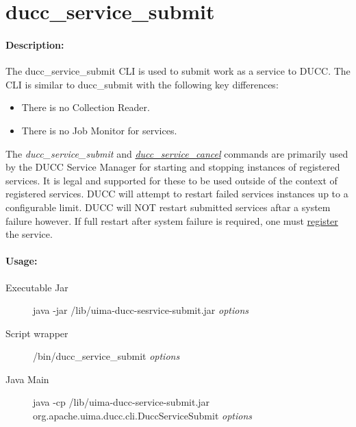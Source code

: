 \ifpdf
\else
{}
\fi
    \section{ducc\_service\_submit}
    \label{sec:cli.service-submit}
    \paragraph{Description:}
    The ducc\_service\_submit CLI is used to submit work as a service to DUCC. The CLI is similar to
    ducc\_submit with the following key differences:
    
    \begin{itemize}
        \item There is no Collection Reader. 
        \item There is no Job Monitor  for services.
    \end{itemize}
        
    The {\em ducc\_service\_submit} and \hyperref[sec:cli.service-cancel]{{\em
        ducc\_service\_cancel}} commands are primarily used by the DUCC Service Manager for starting
    and stopping instances of registered services.  It is legal and supported for these to be used
    outside of the context of registered services.  DUCC will attempt to restart failed services
    instances up to a configurable limit.  DUCC will NOT restart submitted services aftar a
    system failure however.  If full restart after system failure is required, one must
    \hyperref[subsec:cli.ducc-services.register]{register} the service.
 

    \paragraph{Usage:}
    \begin{description}
    \item[Executable Jar] java -jar \ducchome/lib/uima-ducc-sesrvice-submit.jar {\em options}
    \item[Script wrapper] \ducchome/bin/ducc\_service\_submit {\em options}
    \item[Java Main]      java -cp \ducchome/lib/uima-ducc-service-submit.jar org.apache.uima.ducc.cli.DuccServiceSubmit {\em options}
    \end{description}

